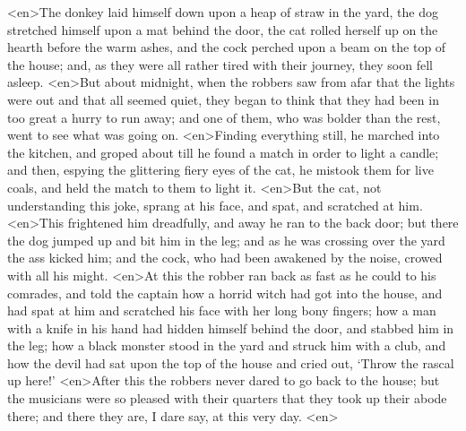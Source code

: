<en>The donkey laid himself down upon a heap of straw in the yard, the dog stretched himself upon a mat behind the door, the cat rolled herself up on the hearth before the warm ashes, and the cock perched upon a beam on the top of the house; and, as they were all rather tired with their journey, they soon fell asleep.
<en>But about midnight, when the robbers saw from afar that the lights were out and that all seemed quiet, they began to think that they had been in too great a hurry to run away; and one of them, who was bolder than the rest, went to see what was going on.
<en>Finding everything still, he marched into the kitchen, and groped about till he found a match in order to light a candle; and then, espying the glittering fiery eyes of the cat, he mistook them for live coals, and held the match to them to light it.
<en>But the cat, not understanding this joke, sprang at his face, and spat, and scratched at him.
<en>This frightened him dreadfully, and away he ran to the back door; but there the dog jumped up and bit him in the leg; and as he was crossing over the yard the ass kicked him; and the cock, who had been awakened by the noise, crowed with all his might.
<en>At this the robber ran back as fast as he could to his comrades, and told the captain how a horrid witch had got into the house, and had spat at him and scratched his face with her long bony fingers; how a man with a knife in his hand had hidden himself behind the door, and stabbed him in the leg; how a black monster stood in the yard and struck him with a club, and how the devil had sat upon the top of the house and cried out, ‘Throw the rascal up here!’ 
<en>After this the robbers never dared to go back to the house; but the musicians were so pleased with their quarters that they took up their abode there; and there they are, I dare say, at this very day.
<en>
